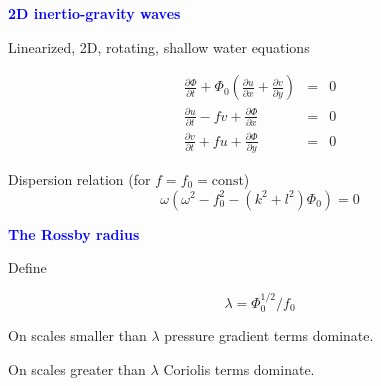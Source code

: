 \documentclass[a4]{seminar}
\newcommand{\B}[1]{\textcolor{blue}{#1}}
\begin{document}

\begin{slide}

\B{\bf 2D inertio-gravity waves}

Linearized, 2D, rotating, shallow water equations

\begin{eqnarray}
\frac{\partial \Phi}{\partial t} +
\Phi_0 \left( \frac{\partial u}{\partial x} + \frac{\partial v}{\partial y} \right)
& = & 0 \nonumber \\
\frac{\partial u}{\partial t} - fv + \frac{\partial \Phi}{\partial x}
& = & 0 \nonumber \\
\frac{\partial v}{\partial t} + fu + \frac{\partial \Phi}{\partial y}
& = & 0 \nonumber
\end{eqnarray}

\vspace{3mm}

Dispersion relation (for \( f = f_0 = \mathrm{const}\))
\begin{displaymath}
\omega \left( \omega^2 - f_0^2 - (k^2 + l^2)\Phi_0 \right) = 0
\end{displaymath}


\end{slide}


\begin{slide}

\B{\bf The Rossby radius}

Define

\begin{displaymath}
\lambda = \Phi_0^{1/2} / f_0
\end{displaymath}

\vspace{2mm}
On scales smaller than \( \lambda \) pressure gradient terms dominate.

\vspace{2mm}
On scales greater than \( \lambda \) Coriolis terms dominate.


\end{slide}

\end{document}
